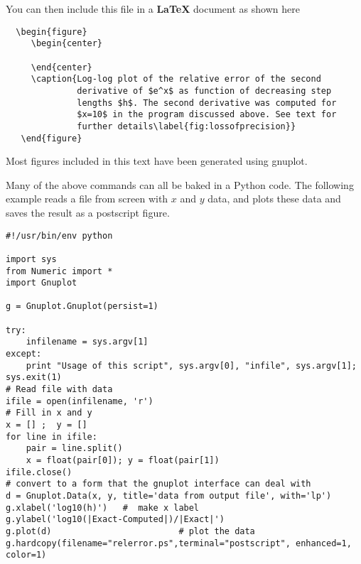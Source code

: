 You can then include this file in a {\bf \LaTeX} document
as shown here
\begin{verbatim}
  \begin{figure}
     \begin{center}
        
     \end{center}
     \caption{Log-log plot of the relative error of the second 
              derivative of $e^x$ as function of decreasing step 
              lengths $h$. The second derivative was computed for 
              $x=10$ in the program discussed above. See text for
              further details\label{fig:lossofprecision}}
   \end{figure}
\end{verbatim}
Most figures included in this text have been generated using gnuplot.
 

Many of the above commands can all be baked in a Python code.  
The following example reads a file from screen with $x$ and $y$ data, and plots these
data and saves the result as a postscript figure.
\lstset{language=python}  
\begin{lstlisting}
#!/usr/bin/env python

import sys
from Numeric import *
import Gnuplot

g = Gnuplot.Gnuplot(persist=1)

try:
    infilename = sys.argv[1]
except:
    print "Usage of this script", sys.argv[0], "infile", sys.argv[1]; sys.exit(1)
# Read file with data
ifile = open(infilename, 'r')
# Fill in x and y
x = [] ;  y = []
for line in ifile:
    pair = line.split()
    x = float(pair[0]); y = float(pair[1])
ifile.close()
# convert to a form that the gnuplot interface can deal with
d = Gnuplot.Data(x, y, title='data from output file', with='lp')
g.xlabel('log10(h)')   #  make x label
g.ylabel('log10(|Exact-Computed|)/|Exact|') 
g.plot(d)                         # plot the data
g.hardcopy(filename="relerror.ps",terminal="postscript", enhanced=1, color=1)
\end{lstlisting} 


